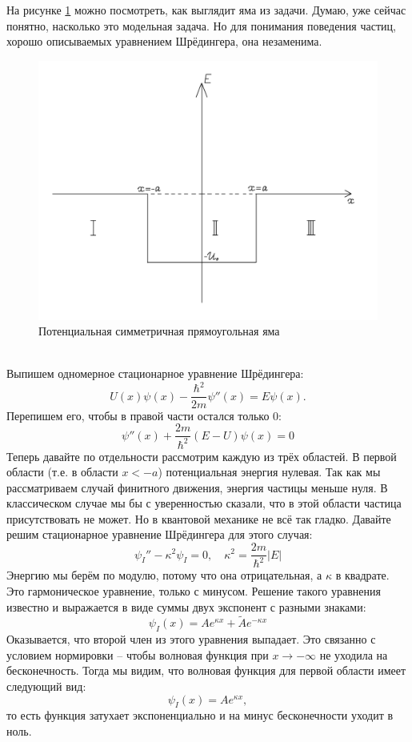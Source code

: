 На рисунке \ref{fig 3.1} можно посмотреть, как выглядит яма из задачи. Думаю, уже сейчас понятно, насколько это модельная задача. Но для понимания поведения частиц, хорошо описываемых уравнением Шрёдингера, она незаменима.
\begin{figure}[h!]
\centering
\includegraphics[scale=0.3]{class 3/images/hole.png}
\caption{Потенциальная симметричная прямоугольная яма}
\label{fig 3.1}
\end{figure}\\
Выпишем одномерное стационарное уравнение Шрёдингера:
\[
U(x)\psi(x) - \frac{\hbar^2}{2m}\psi''(x) = E\psi(x).
\]
Перепишем его, чтобы в правой части остался только 0:
\[
\psi''(x) + \frac{2m}{\hbar^2}(E-U)\psi(x) = 0
\]
Теперь давайте по отдельности рассмотрим каждую из трёх областей. В первой области (т.е. в области $x <-a$) потенциальная энергия нулевая. Так как мы рассматриваем случай финитного движения, энергия частицы меньше нуля. В классическом случае мы бы с уверенностью сказали, что в этой области частица присутствовать не может. Но в квантовой механике не всё так гладко. Давайте решим стационарное уравнение Шрёдингера для этого случая:
\[
\psi_I'' - \kappa^2\psi_I = 0, \quad \kappa^2 = \frac{2m}{\hbar^2}|E|
\]
Энергию мы берём по модулю, потому что она отрицательная, а $\kappa$ в квадрате. Это гармоническое уравнение, только с минусом. Решение такого уравнения известно и выражается в виде суммы двух экспонент с разными знаками:
\[
\psi_I(x) = Ae^{\kappa x} + \widetilde{A}e^{-\kappa x}
\]
Оказывается, что второй член из этого уравнения выпадает. Это связанно с условием нормировки -- чтобы волновая функция при $x \rightarrow -\infty$ не уходила на бесконечность. Тогда мы видим, что волновая функция для первой области имеет следующий вид:
\[
\psi_I(x) = Ae^{\kappa x},
\]
то есть функция затухает экспоненциально и на минус бесконечности уходит в ноль.

